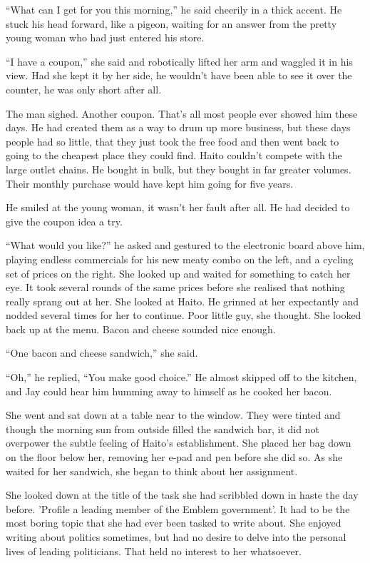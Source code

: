 ``What can I get for you this morning,'' he said cheerily in a thick accent.  He stuck his head forward, like a pigeon, waiting for an answer from the pretty young woman who had just entered his store.

``I have a coupon,'' she said and robotically lifted her arm and waggled it in his view.  Had she kept it by her side, he wouldn't have been able to see it over the counter, he was only short after all.  

The man sighed.  Another coupon.  That's all most people ever showed him these days.  He had created them as a way to drum up more business, but these days people had so little, that they just took the free food and then went back to going to the cheapest place they could find.  Haito couldn't compete with the large outlet chains.  He bought in bulk, but they bought in far greater volumes.  Their monthly purchase would have kept him going for five years.

He smiled at the young woman, it wasn't her fault after all.  He had decided to give the coupon idea a try.

``What would you like?'' he asked and gestured to the electronic board above him, playing endless commercials for his new meaty combo on the left, and a cycling set of prices on the right.  She looked up and waited for something to catch her eye.  It took several rounds of the same prices before she realised that nothing really sprang out at her.  She looked at Haito.  He grinned at her expectantly and nodded several times for her to continue.  Poor little guy, she thought.  She looked back up at the menu.  Bacon and cheese sounded nice enough.

``One bacon and cheese sandwich,'' she said.  

``Oh,'' he replied, ``You make good choice.''  He almost skipped off to the kitchen, and Jay could hear him humming away to himself as he cooked her bacon.

She went and sat down at a table near to the window.  They were tinted and though the morning sun from outside filled the sandwich bar, it did not overpower the subtle feeling of Haito's establishment.  She placed her bag down on the floor below her, removing her e-pad and pen before she did so.  As she waited for her sandwich, she began to think about her assignment.  

She looked down at the title of the task she had scribbled down in haste the day before.  'Profile a leading member of the Emblem government'.  It had to be the most boring topic that she had ever been tasked to write about.  She enjoyed writing about politics sometimes, but had no desire to delve into the personal lives of leading politicians.  That held no interest to her whatsoever.

